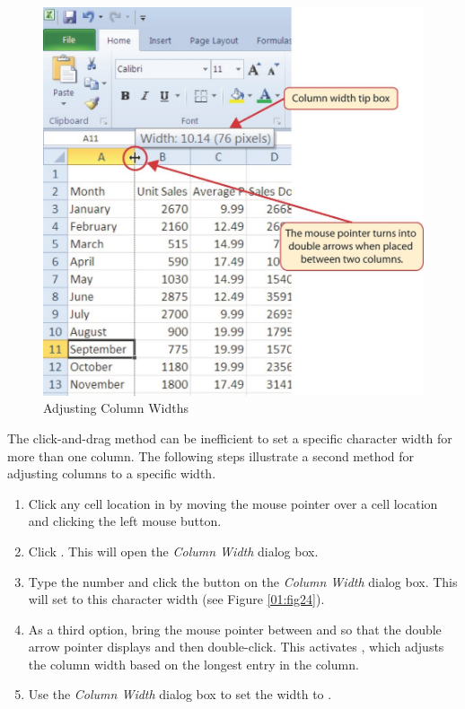 \begin{figure}[H]
	\centering
	\includegraphics[width=\maxwidth{.95\linewidth}]{gfx/ch01_fig23}
	\caption{Adjusting Column Widths}
	\label{01:fig23}
\end{figure}

The click-and-drag method can be inefficient to set a specific character width for more than one column. The following steps illustrate a second method for adjusting columns to a specific width.

\begin{enumbox}
	\begin{enumerate}
		\item Click any cell location in  by moving the mouse pointer over a cell location and clicking the left mouse button. 
		\item Click . This will open the \textit{Column Width} dialog box.
		\item Type the number  and click the  button on the \textit{Column Width} dialog box. This will set  to this character width (see Figure \ref{01:fig24}).
		\item As a third option, bring the mouse pointer between  and  so that the double arrow pointer displays and then double-click. This activates , which adjusts the column width based on the longest entry in the column.
		\item Use the \textit{Column Width} dialog box to set the width to .
	\end{enumerate}
\end{enumbox}
	

